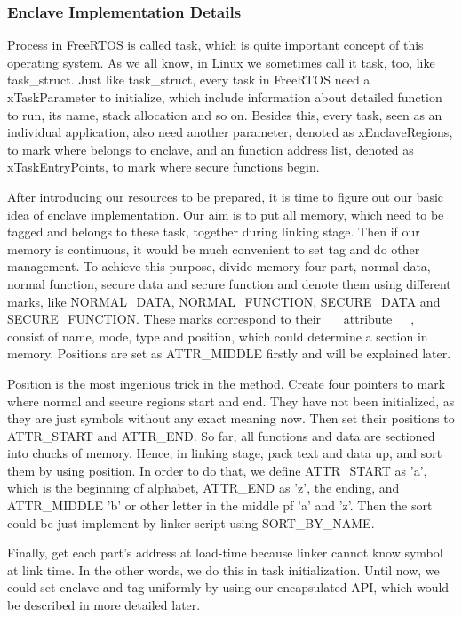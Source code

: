 \documentclass[conference]{IEEEtran}
\begin{document}
\subsubsection{Enclave Implementation Details}

Process in FreeRTOS  is called task, which is quite important concept of this operating system. As we all know, in Linux we sometimes call it task, too, like task\_struct. Just like task\_struct, every task in FreeRTOS need a xTaskParameter to initialize, which include information about detailed function to run, its name, stack allocation and so on. Besides this, every task, seen as an individual application, also need another parameter, denoted as xEnclaveRegions, to mark where belongs to enclave, and an function address list, denoted as xTaskEntryPoints, to mark where secure functions begin.

After introducing our resources to be prepared, it is time to figure out our basic idea of enclave implementation. Our aim is to put all memory, which need to be tagged and belongs to these task, together during linking stage. Then if our memory is continuous, it would be much convenient to set tag and do other management. To achieve this purpose, divide memory four part, normal data, normal function, secure data and secure function and denote them using different marks, like NORMAL\_DATA, NORMAL\_FUNCTION, SECURE\_DATA and SECURE\_FUNCTION. These marks correspond to their \_\_attribute\_\_, consist of name, mode, type and position, which could determine a section in memory. Positions are set as ATTR\_MIDDLE firstly and will be explained later.

Position is the most ingenious trick in the method. Create four pointers to mark where normal and secure regions start and end. They have not been initialized, as they are just symbols without any exact meaning now. Then set their positions to ATTR\_START and ATTR\_END. So far, all functions and data are sectioned into chucks of memory.  Hence, in linking stage, pack text and data up, and sort them by using position. In order to do that, we define ATTR\_START as 'a', which is the beginning of alphabet, ATTR\_END as 'z', the ending, and ATTR\_MIDDLE 'b' or other letter in the middle pf 'a' and 'z'. Then the sort could be just implement by linker script using SORT\_BY\_NAME.

Finally, get each part's address at load-time because linker cannot know symbol at link time. In the other words, we do this in task initialization. Until now, we could set enclave and tag uniformly by using our encapsulated API, which would be described in more detailed later.
\end{document}
